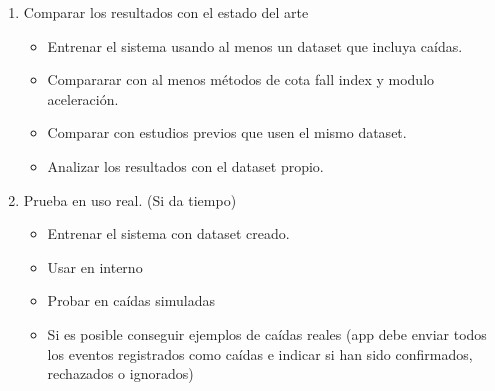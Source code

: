 \documentclass[../tfm.tex]{subfiles}
\begin{document}
\begin{enumerate}
  \item Comparar los resultados con el estado del arte
  \begin{itemize}
    \item Entrenar el sistema usando al menos un dataset que incluya caídas.
    \item Compararar con al menos métodos de cota fall index y modulo aceleración.
    \item Comparar con estudios previos que usen el mismo dataset.
    \item Analizar los resultados con el dataset propio.
  \end{itemize}

  \item Prueba en uso real. (Si da tiempo)
  \begin{itemize}
    \item Entrenar el sistema con dataset creado.
    \item Usar en interno
    \item Probar en caídas simuladas
    \item Si es posible conseguir ejemplos de caídas reales (app debe enviar todos los eventos registrados como caídas e indicar si han sido confirmados, rechazados o ignorados)
  \end{itemize}


\end{enumerate}
\end{document}
